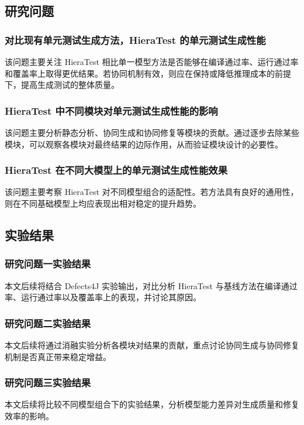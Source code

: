\subsection{研究问题}

\subsubsection{对比现有单元测试生成方法，HieraTest 的单元测试生成性能}

该问题主要关注 HieraTest 相比单一模型方法是否能够在编译通过率、运行通过率和覆盖率上取得更优结果。若协同机制有效，则应在保持或降低推理成本的前提下，提高生成测试的整体质量。

\subsubsection{HieraTest 中不同模块对单元测试生成性能的影响}

该问题主要分析静态分析、协同生成和协同修复等模块的贡献。通过逐步去除某些模块，可以观察各模块对最终结果的边际作用，从而验证模块设计的必要性。

\subsubsection{HieraTest 在不同大模型上的单元测试生成性能效果}

该问题主要考察 HieraTest 对不同模型组合的适配性。若方法具有良好的通用性，则在不同基础模型上均应表现出相对稳定的提升趋势。

\subsection{实验结果}

\subsubsection{研究问题一实验结果}

本文后续将结合 Defects4J 实验输出，对比分析 HieraTest 与基线方法在编译通过率、运行通过率以及覆盖率上的表现，并讨论其原因。

\subsubsection{研究问题二实验结果}

本文后续将通过消融实验分析各模块对结果的贡献，重点讨论协同生成与协同修复机制是否真正带来稳定增益。

\subsubsection{研究问题三实验结果}

本文后续将比较不同模型组合下的实验结果，分析模型能力差异对生成质量和修复效率的影响。
